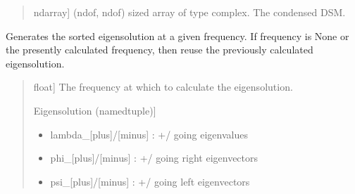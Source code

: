 \documentclass[letterpaper,10pt,english]{sphinxmanual}
\begin{document}
\begin{fulllineitems}
\begin{fulllineitems}
\begin{quote}
\begin{description}
\begin{description}
\end{description}

\begin{description}
\sphinxlineitem{\sphinxstylestrong{DSM}}{[}ndarray{]}
\sphinxAtStartPar
(ndof, ndof) sized array of type complex. The condensed DSM.

\end{description}

\end{description}\end{quote}

\end{fulllineitems}


\begin{fulllineitems}
\label{\detokenize{model:pywfe.Model.generate_eigensolution}}
\pysigstartsignatures
{}
\pysigstopsignatures
\sphinxAtStartPar
Generates the sorted eigensolution at a given frequency.
If frequency is None or the presently calculated frequency,
then reuse the previously calculated eigensolution.
\begin{quote}\begin{description}
\begin{description}
\sphinxlineitem{\sphinxstylestrong{f}}{[}float{]}
\sphinxAtStartPar
The frequency at which to calculate the eigensolution.

\end{description}

\begin{description}
\sphinxlineitem{\sphinxstylestrong{eigensolution}}{[}Eigensolution (namedtuple){]}\begin{description}
\begin{itemize}
\item {} 
\sphinxAtStartPar
lambda\_{[}plus{]}/{[}minus{]} : +/\sphinxhyphen{} going eigenvalues

\item {} 
\sphinxAtStartPar
phi\_{[}plus{]}/{[}minus{]} : +/\sphinxhyphen{} going right eigenvectors

\item {} 
\sphinxAtStartPar
psi\_{[}plus{]}/{[}minus{]} : +/\sphinxhyphen{} going left eigenvectors


\end{itemize}
\end{description}
\end{description}
\end{description}
\end{quote}
\end{fulllineitems}
\end{fulllineitems}
\end{document}
